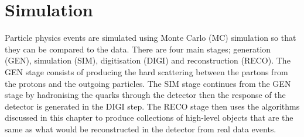 \section{Simulation}
Particle physics events are simulated using Monte Carlo (MC) simulation so that they can be compared to the data. There are four main stages; generation (GEN), simulation (SIM), digitisation (DIGI) and reconstruction (RECO). The GEN stage consists of producing the hard scattering between the partons from the protons and the outgoing particles. The SIM stage continues from the GEN stage by hadronising the quarks through the detector then the response of the detector is generated in the DIGI step. The RECO stage then uses the algorithms discussed in this chapter to produce collections of high-level objects that are the same as what would be reconstructed in the detector from real data events.


